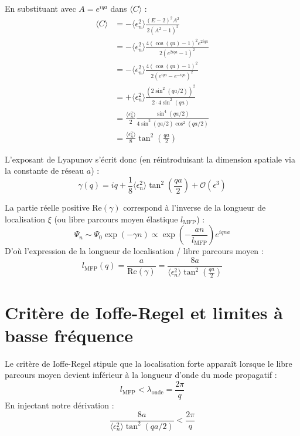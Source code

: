 En substituant avec $A = e^{iqa}$ dans $\langle C \rangle$ :
\begin{align}
    \langle C \rangle &= -\langle \epsilon_n^2 \rangle \frac{(E - 2)^2 A^2}{2(A^2 - 1)^2} \nonumber \\
    &= -\langle \epsilon_n^2 \rangle \frac{4(\cos(qa) - 1)^2 e^{2iqa}}{2(e^{2iqa} - 1)^2} \nonumber \\
    &= -\langle \epsilon_n^2 \rangle \frac{4(\cos(qa) - 1)^2}{2(e^{iqa} - e^{-iqa})^2} \nonumber \\
    &= +\langle \epsilon_n^2 \rangle \frac{\left( 2\sin^2(qa/2) \right)^2}{2 \cdot 4\sin^2(qa)} \nonumber \\
    &= \frac{\langle \epsilon_n^2 \rangle}{2} \frac{\sin^4(qa/2)}{4\sin^2(qa/2)\cos^2(qa/2)} \nonumber \\
    &= \frac{\langle \epsilon_n^2 \rangle}{8} \tan^2\left(\frac{qa}{2}\right)
\end{align}

L'exposant de Lyapunov s'écrit donc (en réintroduisant la dimension spatiale via la constante de réseau $a$) :
\begin{equation}
    \gamma(q) = iq + \frac{1}{8}\langle\epsilon_n^2\rangle \tan^2\left(\frac{qa}{2}\right) + \mathcal{O}(\epsilon^3)
\end{equation}

La partie réelle positive $\text{Re}(\gamma)$ correspond à l'inverse de la longueur de localisation $\xi$ (ou libre parcours moyen élastique $l_{\text{MFP}}$) :
\begin{equation}
    \Psi_n \sim \Psi_0 \exp(-\gamma n) \propto \exp\left( -\frac{an}{l_{\text{MFP}}} \right) e^{iqna}
\end{equation}
D'où l'expression de la longueur de localisation / libre parcours moyen :
\begin{equation}
    l_{\text{MFP}}(q) = \frac{a}{\text{Re}(\gamma)} = \frac{8a}{\langle\epsilon_n^2\rangle \tan^2\left(\frac{qa}{2}\right)}
\end{equation}

\section{Critère de Ioffe-Regel et limites à basse fréquence}

Le critère de Ioffe-Regel stipule que la localisation forte apparaît lorsque le libre parcours moyen devient inférieur à la longueur d'onde du mode propagatif :
\begin{equation}
    l_{\text{MFP}} < \lambda_{\text{onde}} = \frac{2\pi}{q}
\end{equation}
En injectant notre dérivation :
\begin{equation}
    \frac{8a}{\langle\epsilon_n^2\rangle \tan^2(qa/2)} < \frac{2\pi}{q}
\end{equation}

